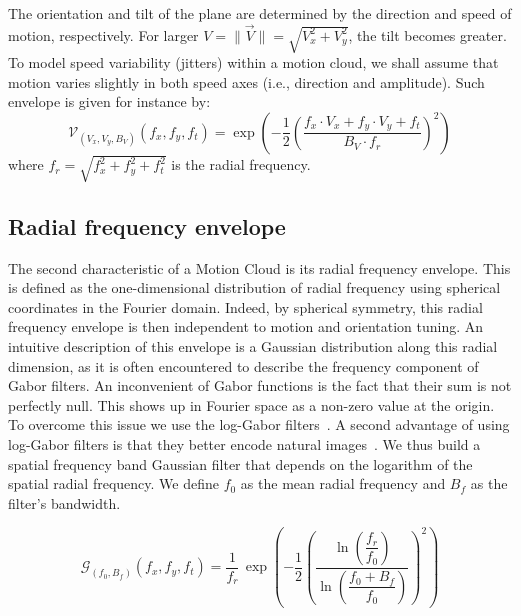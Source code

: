 \documentclass[a4paper,11pt]{article}%
\begin{document}
The orientation and tilt of the plane are determined by the direction and speed of motion, respectively. For larger $V=\| \vec{V} \|=\sqrt{V_x^2+V_y^2}$, the tilt  becomes greater. To model speed variability (jitters) within a motion cloud, we shall assume that motion  varies slightly in both speed axes (i.e., direction and amplitude). Such envelope is given for instance by: %
\begin{equation} %
\mathcal{V}_{(V_x, V_y, B_{V})}(f_{x}, f_{y}, f_{t})=\exp\left(-\dfrac{1}{2}\left( \dfrac{ f_x\cdot V_x + f_y\cdot V_y + f_t }{B_{V} \cdot f_r} \right)^{2} \right)
\label{eq:envelope_speed_plane} %
\end{equation} %
where  $ f_r = \sqrt{f_x^2 + f_y^2 + f_t^2} $ is the radial frequency.  %

\subsection{Radial frequency envelope}
The second characteristic of a Motion  Cloud is its radial frequency envelope. This is defined as the one-dimensional distribution of radial frequency using spherical coordinates in the Fourier domain. Indeed, by spherical symmetry, this radial frequency envelope is then independent to motion and orientation tuning. An intuitive description of this envelope is a Gaussian distribution along this radial dimension, as it is often encountered to describe the frequency component of Gabor filters. An inconvenient of Gabor functions is the fact that their sum is not perfectly null. This shows up in Fourier space as a non-zero value at the origin. To overcome this issue we use the log-Gabor filters~\citep{Fischer07}. A second advantage of using log-Gabor filters is that they better encode natural images~\citep{Field87}. We thus  build a spatial frequency band Gaussian filter that depends on the logarithm of the spatial radial frequency. We define $f_0$ as the mean radial frequency and $B_{f}$ as the filter's bandwidth. %

\begin{equation}
 \mathcal{G}_{(f_0,B_{f})} (f_{x}, f_{y}, f_{t})=\dfrac{1}{f_r}\,\exp\left(-\dfrac{1}{2}\left(\dfrac{\ln\left(\dfrac{f_r}{f_0}\right)}{\ln\left(\dfrac{f_0+B_{f}}{f_0}\right)}\right)^{2}\right)
\label{eq:envelope_sphere}
\end{equation}
\end{document}
